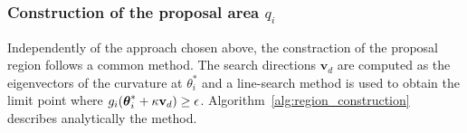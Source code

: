 \subsubsection{Construction of the proposal area $q_i$}

Independently of the approach chosen above, the constraction of the proposal region follows a common method. The search directions $\mathbf{v}_d$ are computed as the eigenvectors of the curvature at $\theta_i^*$ and a line-search method is used to obtain the limit point where $g_i(\boldsymbol{\theta}_i^* + \kappa \mathbf{v}_d) \geq \epsilon$. Algorithm~\ref{alg:region_construction} describes analytically the method.
